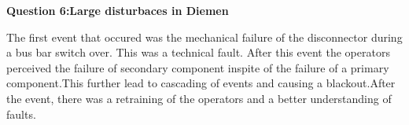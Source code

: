 {\textbf{Question 6:Large disturbaces in Diemen}}
\item The first event that occured was the mechanical failure of the disconnector during a bus bar switch over. This was a technical fault. After this event the operators perceived the failure of secondary component inspite of the failure of a primary component.This further lead to cascading of events and causing a blackout.After the event, there was a retraining of the operators and a better understanding of faults.